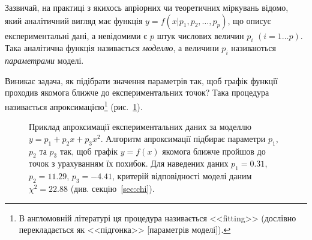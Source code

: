 \documentclass{LabBook}
\begin{document}
  Зазвичай, на практиці з якихось апріорних чи теоретичних міркувань відомо, який аналітичний вигляд має функція $y = f (x| p_1, p_2, \ldots, p_p)$, що описує експериментальні дані, а невідомими є $p$ штук числових величин $p_i$ $(i = 1 \ldots p)$. Така аналітична функція називається \emph{моделлю}, а величини $p_i$ називаються \emph{параметрами} моделі.

  Виникає задача, як підібрати значення параметрів так, щоб графік функції проходив якомога ближче до експериментальних точок? Така процедура називається апроксимацією\footnote{В англомовній літературі ця процедура називається <<fitting>> (дослівно перекладається як <<підгонка>> [параметрів моделі]).} (рис.~\ref{pic:some_data}).

  \begin{figure}[!htbp]\centering
    \caption{Приклад апроксимації експериментальних даних за моделлю $y = p_1 + p_2x + p_3x^2$. Алгоритм апроксимації підбирає параметри $p_1$, $p_2$ та $p_3$ так, щоб графік $y = f(x)$ якомога ближче пройшов до точок з урахуванням їх похибок. Для  наведених даних $p_1 = 0.31$, $p_2 = 11.29$, $p_3 = -4.41$, критерій відповідності моделі даним $\chi^2  = 22.88$  (див. секцію~\ref{sec:chi}).}
    \label{pic:some_data}
  \end{figure}
\end{document}
